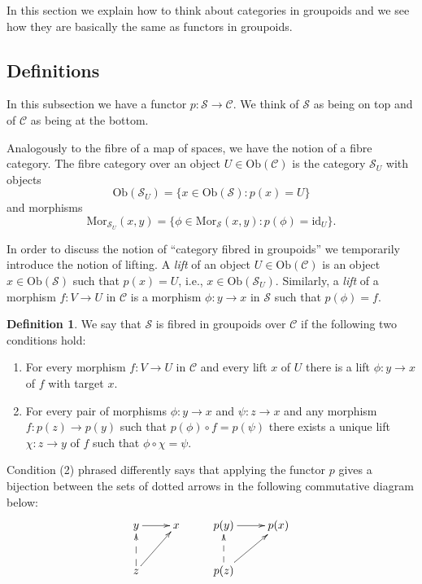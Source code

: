 \documentclass{amsart}
\theoremstyle{definition}
\newtheorem{definition}[theorem]{Definition}
\theoremstyle{remark}
\numberwithin{equation}{subsection}
\begin{document}
\noindent
In this section we explain how to think about categories in groupoids and
we see how they are basically the same as functors in groupoids.

\subsection{Definitions}
\label{subsection-categories-groupoids-definition}

\noindent
In this subsection we have a functor $p : \mathcal{S} \to \mathcal{C}$.
We think of $\mathcal{S}$ as being on top and of $\mathcal{C}$ as being
at the bottom.

\smallskip\noindent
Analogously to the fibre of a map of spaces, we have the notion of a 
fibre category. The fibre category over an object 
$U\in \text{Ob}(\mathcal{C})$ is the category $\mathcal{S}_U$ with 
objects
$$
\text{Ob}(\mathcal{S}_U) = \{x\in \text{Ob}(\mathcal{S}) :
p(x)=U\}
$$
and morphisms 
$$
\text{Mor}_{\mathcal{S}_U}(x,y) = \{ \phi \in \text{Mor}_\mathcal{S}(x,y) :
p(\phi) = \text{id}_U\}.
$$

\smallskip\noindent
In order to discuss the notion of ``category fibred in groupoids'' we
temporarily introduce the notion of lifting.
A {\it lift} of an object $U \in \text{Ob}(\mathcal{C})$ is an object 
$x\in \text{Ob}(\mathcal{S})$ such that $p(x)=U$, i.e., 
$x\in \text{Ob}(\mathcal{S}_U)$.  
Similarly, a {\it lift} of a morphism $f : V \to U$ in $\mathcal{C}$ is a 
morphism $\phi : y \to x$ in $\mathcal{S}$ such that $p(\phi)=f$.

\begin{definition}
\label{definition-fibred-groupoids}
We say that $\mathcal{S}$ is fibred in groupoids over $\mathcal{C}$ if
the following two conditions hold:
\begin{enumerate}
\item For every morphism $f : V \to U$ in $\mathcal{C}$ and every
lift $x$ of $U$ there is a lift $\phi : y \to x$ of $f$ with
target $x$.
\item For every pair of morphisms $ \phi : y \to x$ and $ \psi : z \to x$
and any morphism $ f : p(z) \to p(y)$ such that $ p(\phi) \circ f = 
p(\psi)$ there exists a unique lift $ \chi : z \to y$ of $f$ such that
$\phi \circ \chi = \psi$.
\end{enumerate}
\end{definition}

\noindent
Condition (2) phrased differently says that 
applying the functor $p$ gives a bijection between the sets 
of dotted arrows in the following commutative diagram below:
$$
\xymatrix{
y \ar[r] & x & p(y) \ar[r] & p(x) \\
z \ar@{-->}[u] \ar[ru] & & p(z) \ar@{-->}[u]\ar[ru] & \\
}
$$
\end{document}
